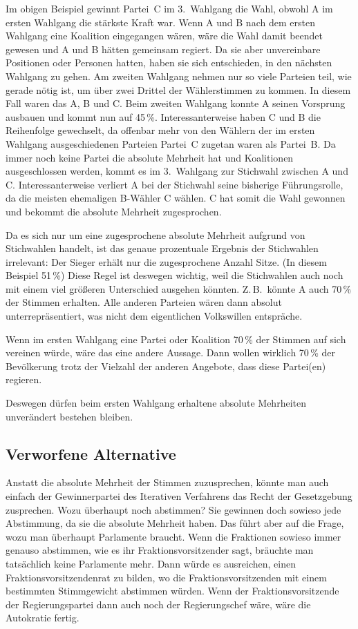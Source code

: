 \bigskip

Im obigen Beispiel gewinnt Partei~C im 3.~Wahlgang die Wahl, obwohl A im ersten Wahlgang die
stärkste Kraft war. Wenn A und B nach dem ersten Wahlgang eine Koalition eingegangen wären, wäre
die Wahl damit beendet gewesen und A und B hätten gemeinsam regiert. Da sie aber unvereinbare
Positionen oder Personen hatten, haben sie sich entschieden, in den nächsten Wahlgang zu gehen.
Am zweiten Wahlgang nehmen nur so viele Parteien teil, wie gerade nötig ist, um über zwei Drittel
der Wählerstimmen zu kommen. In diesem Fall waren das A, B und C. Beim zweiten Wahlgang konnte A
seinen Vorsprung ausbauen und kommt nun auf 45\,\%. Interessanterweise haben C und B die
Reihenfolge gewechselt, da offenbar mehr von den Wählern der im ersten Wahlgang ausgeschiedenen
Parteien Partei~C zugetan waren als Partei~B.
Da immer noch keine Partei die absolute Mehrheit hat und Koalitionen ausgeschlossen werden,
kommt es im 3.~Wahlgang zur Stichwahl zwischen A und C. Interessanterweise verliert A bei der
Stichwahl seine bisherige Führungsrolle, da die meisten ehemaligen B-Wähler C wählen. C hat
somit die Wahl gewonnen und bekommt die absolute Mehrheit zugesprochen.

Da es sich nur um eine
zugesprochene absolute Mehrheit aufgrund von Stichwahlen handelt, ist das genaue prozentuale
Ergebnis der Stichwahlen irrelevant: Der Sieger erhält nur die zugesprochene Anzahl Sitze. (In
diesem Beispiel 51\,\%) Diese Regel ist deswegen wichtig, weil die Stichwahlen auch noch mit
einem viel größeren Unterschied ausgehen könnten. Z.\,B.\ könnte A auch 70\,\% der Stimmen
erhalten. Alle anderen Parteien wären dann absolut unterrepräsentiert, was nicht dem eigentlichen
Volkswillen entspräche.

Wenn im ersten Wahlgang eine Partei oder Koalition 70\,\% der Stimmen auf
sich vereinen würde, wäre das eine andere Aussage. Dann wollen wirklich 70\,\% der Bevölkerung
trotz der Vielzahl der anderen Angebote, dass diese Partei(en) regieren.

Deswegen dürfen beim ersten Wahlgang erhaltene absolute Mehrheiten unverändert bestehen bleiben.

\subsection{Verworfene Alternative}

Anstatt die absolute Mehrheit der Stimmen zuzusprechen, könnte man auch einfach der
Gewinnerpartei des Iterativen Verfahrens das Recht der Gesetzgebung zusprechen. Wozu überhaupt
noch abstimmen? Sie gewinnen doch sowieso jede Abstimmung, da sie die absolute Mehrheit haben.
Das führt aber auf die Frage, wozu man überhaupt Parlamente braucht. Wenn die Fraktionen sowieso
immer genauso abstimmen, wie es ihr Fraktionsvorsitzender sagt, bräuchte man tatsächlich keine
Parlamente mehr. Dann würde es ausreichen, einen Fraktionsvorsitzendenrat zu bilden, wo die
Fraktionsvorsitzenden mit einem bestimmten Stimmgewicht abstimmen würden. Wenn der
Fraktionsvorsitzende der Regierungspartei dann auch noch der Regierungschef wäre, wäre die
Autokratie fertig.

